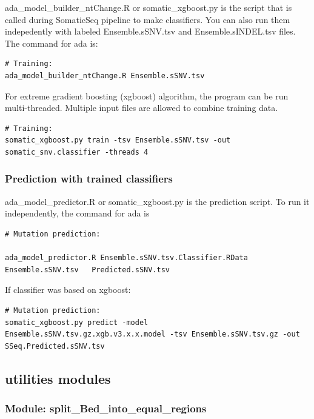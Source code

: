 \documentclass[10pt,letterpaper]{article}
\begin{document}
\begin{sloppypar}
ada\_model\_builder\_ntChange.R or somatic\_xgboost.py is the script that is called during SomaticSeq pipeline to make classifiers. You can also run them indepedently with labeled Ensemble.sSNV.tsv and Ensemble.sINDEL.tsv files. The command for ada is:

\begin{lstlisting}
# Training:
ada_model_builder_ntChange.R Ensemble.sSNV.tsv
\end{lstlisting}


For extreme gradient boosting (xgboost) algorithm, the program can be run multi-threaded. Multiple input files are allowed to combine training data. 

\begin{lstlisting}
# Training:
somatic_xgboost.py train -tsv Ensemble.sSNV.tsv -out somatic_snv.classifier -threads 4
\end{lstlisting}



\subsubsection{Prediction with trained classifiers} \label{module:prediction}

ada\_model\_predictor.R or somatic\_xgboost.py is the prediction script. To run it independently, the command for ada is
      
\begin{lstlisting}
# Mutation prediction:

ada_model_predictor.R Ensemble.sSNV.tsv.Classifier.RData   Ensemble.sSNV.tsv   Predicted.sSNV.tsv
\end{lstlisting}

If classifier was based on xgboost:
\begin{lstlisting}
# Mutation prediction:
somatic_xgboost.py predict -model Ensemble.sSNV.tsv.gz.xgb.v3.x.x.model -tsv Ensemble.sSNV.tsv.gz -out SSeq.Predicted.sSNV.tsv
\end{lstlisting}





\subsection{utilities modules} \label{module:utilities}

\subsubsection{Module: split\_Bed\_into\_equal\_regions} \label{module:split_bed}


\end{sloppypar}
\end{document}
